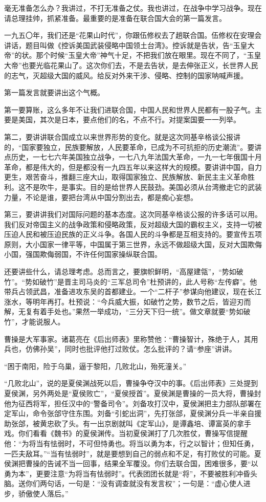 毫无准备怎么办？我讲过，不打无准备之仗。我也讲过，在战争中学习战争。现在请总理挂帅，抓紧准备。最重要的是准备在联合国大会的第一篇发言。

一九五〇年，我们还是“花果山时代”，你跟伍修权去了趟联合国。伍修权在安理会讲话，题目叫做《控诉美国武装侵略中国领土台湾》。控诉就是告状，告“玉皇大帝”的状。那个时候“玉皇大帝”神气十足，不把我们放在眼里。现在不同了，“玉皇大帝”也要光临花果山了。这次你们去，不是去告状，是去伸张正义，长世界人民的志气，灭超级大国的威风。给反对外来干涉、侵略、控制的国家呐喊声援。

第一篇发言就要讲出这个气概。

第一要算账，这么多年不让我们进联合国，中国人民和世界人民都有一股子气。主要是美国，其次是日本，要点他们的名，不点不行。对提案国要一一列举。

第二，要讲讲联合国成立以来世界形势的变化。就是这次同基辛格谈公报讲的，“国家要独立，民族要解放，人民要革命，已成为不可抗拒的历史潮流”。要讲点历史，一七七六年美国独立战争，一七八九年法国大革命，一九一七年俄国十月革命，都是伟大的，但是都没有一九四五年以来这样大的规模。要讲讲中国，自力更生，艰苦奋斗，推翻三座大山，取得国家独立、民族解放、新民主主义革命胜利。这不是吹牛，是事实。目的是给世界人民鼓劲。美国必须从台湾撤走它的武装力量，不论是谁，要把台湾从中国分割出去，都是痴心妄想。

第三，要讲讲我们对国际问题的基本态度。这次同基辛格谈公报的许多话可以用。我们反对帝国主义的战争政策和侵略政策，反对超级大国的霸权主义，支持一切被压迫人民和被压迫民族的正义斗争。各国人民的斗争都是互相支持的。要宣传五项原则，大小国家一律平等，中国属于第三世界，永远不做超级大国，反对大国欺侮小国，强国欺侮弱国，不许任何国家操纵联合国。

还要讲些什么，请总理考虑。总而言之，要旗帜鲜明，“高屋建瓴”，“势如破竹”。“势如破竹”是晋主司马炎的“三军总司令”杜预讲的，此人号称“左传癖”。他带兵占领武昌，准备进攻东吴的首都建业。一个“二杆子”参谋向他建议，现在长江涨水，等明年再打。杜预说：“今兵威大振，如破竹之势，数节之后，皆迎刃而解，无复有着手处也。”果然一举成功，“三分天下归一统”。做文章就要“势如破竹”，才能说服人。

曹操是大军事家。诸葛亮在《后出师表》里称赞他：“曹操智计，殊绝于人，其用兵也，仿佛孙吴”，同时也批评他打过败仗。怎么批评的？请“参座”讲讲。

“困于南阳，险于乌巢，逼于黎阳，几败北山，殆死潼关。”

“几败北山”，说的是夏侯渊战死以后，曹操争夺汉中的事。《后出师表》三处提到夏侯渊，另外两处是“夏侯败亡”，“夏侯授首”。夏侯渊是曹操的一员大将，曹操封他为征西将军，担任汉中的“警备司令”。刘备攻打汉中，夏侯渊把主力部队部署在定军山，命令张郃守住东围。刘备“引蛇出洞”，先打张郃，夏侯渊分兵一半亲自援助张郃，被黄忠砍了头。有一出京剧就叫《定军山》，是谭鑫培、谭富英的拿手戏。你们看看《魏书》的夏侯渊传。当初夏侯渊打了几次胜仗，曹操写信提醒他：“为将当有怯弱时，不可但恃勇也。将当以勇为本，行之以智计；但知任勇，一匹夫敌耳。”“当有怯弱时”，就是要想到自己的弱点和不足，有打败仗的可能。夏侯渊把曹操的告诫不当一回事，结果全军覆没。你们去联合国，困难很多，要“以勇为本”，更要注意“为将当有怯弱时”。代表团团长就是“将”，不要被胜利冲昏头脑。送你们两句话，一句是：“没有调查就没有发言权”；一句是：“虚心使人进步，骄傲使人落后。”

